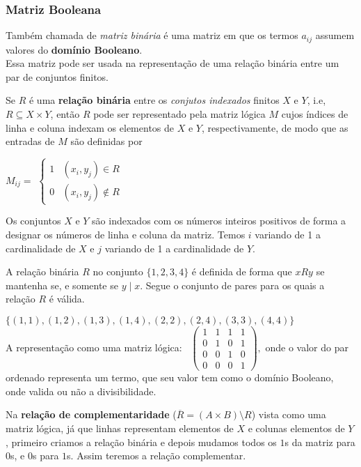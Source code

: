 \subsubsection*{Matriz Booleana}
Também chamada de \textit{matriz binária} é uma matriz em que os termos $a_{ij}$ assumem valores do \textbf{domínio Booleano}.\\
Essa matriz pode ser usada na representação de uma relação binária entre um par de conjuntos finitos.
\begin{definition}
  Se $R$ é uma \textbf{relação binária} entre os \textit{conjutos indexados} finitos $X$ e $Y$, i.e, $R \subseteq X \times Y$, então $R$ pode ser representado pela matriz lógica $M$ cujos índices de linha e coluna indexam os elementos de $X$ e $Y$, respectivamente, de modo que as entradas de $M$ são definidas por
\begin{center}
$M_{ij} = $
$\begin{cases}
1 & (x_{i}, y_{j}) \in R \\ 
0 & (x_{i}, y_{j}) \notin R
\end{cases}$
\end{center}
Os conjuntos $X$ e $Y$ são indexados com os números inteiros positivos de forma a designar os números de linha e coluna da matriz. Temos $i$ variando de 1 a cardinalidade de $X$ e $j$ variando de 1 a cardinalidade de $Y$.
\end{definition}
\begin{exmp}
  A relação binária $R$ no conjunto $\{1,2,3,4\}$ é definida de forma que $xRy$ se mantenha se, e somente se $y \mid x$. Segue o conjunto de pares para os quais a relação $R$ é válida.
  
  $\{(1,1),(1,2),(1,3),(1,4),(2,2),(2,4),(3,3),(4,4)\}$\\
A representação como uma matriz lógica: \ 
$\begin{pmatrix}
1 & 1 & 1 & 1 \\
0 & 1 & 0 & 1 \\
0 & 0 & 1 & 0 \\
0 & 0 & 0 & 1
\end{pmatrix},$ 
onde o valor do par ordenado representa um termo, que seu valor tem como o domínio Booleano, onde valida ou não a divisibilidade.
\end{exmp}
Na \textbf{relação de complementaridade} ($\overline{R} = (A \times B) \setminus R$) vista como uma matriz lógica, já que linhas representam elementos de $X$ e colunas elementos de $Y$, primeiro criamos a relação binária e depois mudamos todos os $1$s da matriz para $0$s, e $0$s para $1$s. Assim teremos a relação complementar.